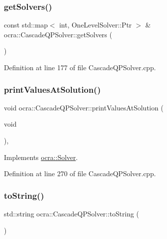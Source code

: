 \subsubsection{\texorpdfstring{get\+Solvers()}{getSolvers()}}
{\footnotesize\ttfamily const std\+::map$<$ int, One\+Level\+Solver\+::\+Ptr $>$ \& ocra\+::\+Cascade\+Q\+P\+Solver\+::get\+Solvers (\begin{DoxyParamCaption}{ }\end{DoxyParamCaption})}



Definition at line 177 of file Cascade\+Q\+P\+Solver.\+cpp.

\hypertarget{classocra_1_1CascadeQPSolver_a1f4c5d709ce4545c596c864b1d99d08c}{}\label{classocra_1_1CascadeQPSolver_a1f4c5d709ce4545c596c864b1d99d08c} 
\subsubsection{\texorpdfstring{print\+Values\+At\+Solution()}{printValuesAtSolution()}}
{\footnotesize\ttfamily void ocra\+::\+Cascade\+Q\+P\+Solver\+::print\+Values\+At\+Solution (\begin{DoxyParamCaption}\item[{void}]{ }\end{DoxyParamCaption})\hspace{0.3cm}{\ttfamily [protected]}, {\ttfamily [virtual]}}



Implements \hyperlink{classocra_1_1Solver_ab1903098e25c16a9f92c36d37967e8fa}{ocra\+::\+Solver}.



Definition at line 270 of file Cascade\+Q\+P\+Solver.\+cpp.

\hypertarget{classocra_1_1CascadeQPSolver_a411f14ee5770be6a3f04d665ac844e6c}{}\label{classocra_1_1CascadeQPSolver_a411f14ee5770be6a3f04d665ac844e6c} 
\subsubsection{\texorpdfstring{to\+String()}{toString()}}
{\footnotesize\ttfamily std\+::string ocra\+::\+Cascade\+Q\+P\+Solver\+::to\+String (\begin{DoxyParamCaption}{ }\end{DoxyParamCaption})\hspace{0.3cm}{\ttfamily [virtual]}}


